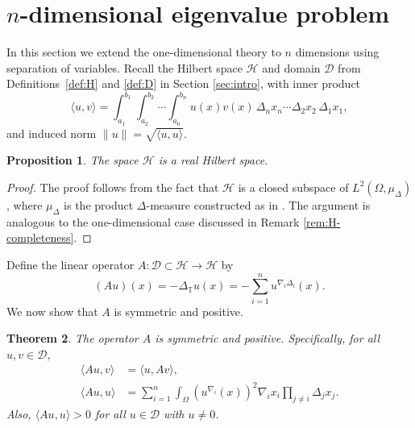 \documentclass{article}
\newtheorem{theorem}{Theorem}[section]
\newtheorem{proposition}[theorem]{Proposition}
\numberwithin{equation}{section}
\numberwithin{theorem}{section}
\begin{document}
\section{$n$-dimensional eigenvalue problem}\label{sec:nD}
In this section we extend the one-dimensional theory to $n$ dimensions using separation of variables. Recall the Hilbert space $\mathscr{H}$ and domain $\mathscr{D}$ from Definitions~\ref{def:H} and \ref{def:D} in Section \ref{sec:intro}, with inner product
\begin{equation}\label{eq:nD-inner-product}
\langle u, v \rangle = \int_{a_1}^{b_1} \int_{a_2}^{b_2} \cdots \int_{a_n}^{b_n} u(x)v(x)\,\Delta_n x_n \cdots \Delta_2 x_2\,\Delta_1 x_1,
\end{equation}
and induced norm $\|u\| = \sqrt{\langle u, u \rangle}$.

\begin{proposition}\label{prop:H-complete}
The space $\mathscr{H}$ is a real Hilbert space.
\end{proposition}

\begin{proof}
The proof follows from the fact that $\mathscr{H}$ is a closed subspace of $L^2(\Omega, \mu_\Delta)$, where $\mu_\Delta$ is the product $\Delta$-measure constructed as in \cite{Bohner-Guseinov-Lebesgue}. The argument is analogous to the one-dimensional case discussed in Remark \ref{rem:H-completeness}.
\end{proof}
Define the linear operator $A\colon \mathscr{D} \subset \mathscr{H} \to \mathscr{H}$ by
\begin{equation}\label{eq:nD-operator}
(Au)(x) = -\Delta_{\mathbb{T}} u(x) = -\sum_{i=1}^{n} u^{\nabla_i\Delta_i}(x).
\end{equation}
We now show that $A$ is symmetric and positive.
\begin{theorem}\label{thm:nD-self-adjoint}
The operator $A$ is symmetric and positive. Specifically, for all $u, v \in \mathscr{D}$,
\begin{align}
\langle Au, v \rangle &= \langle u, Av \rangle, \label{eq:nD-symmetric}\\
\langle Au, u \rangle &= \sum_{i=1}^{n} \int_{\Omega} \left( u^{\nabla_i}(x) \right)^2 \nabla_i x_i \prod_{j \neq i} \Delta_j x_j. \label{eq:nD-positive}
\end{align}
Also, $\langle Au, u \rangle > 0$ for all $u \in \mathscr{D}$ with $u \neq 0$.
\end{theorem}
\end{document}
